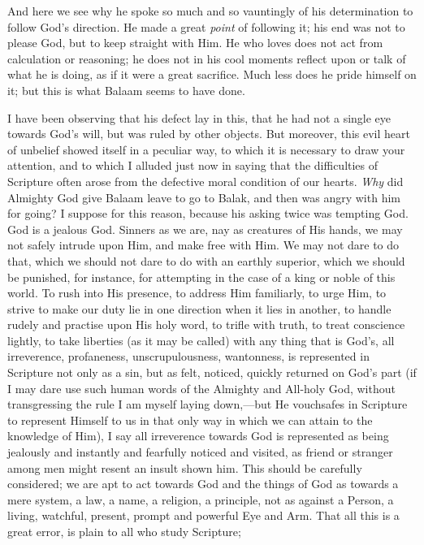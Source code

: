 And here we see why he spoke so much and so vauntingly of his
determination to follow God's direction. He made a great \emph{point}
of following it; his end was not to please God, but to keep straight
with Him. He who loves does not act from calculation or reasoning; he
does not in his cool moments reflect upon or talk of what he is doing,
as if it were a great sacrifice. Much less does he pride himself on
it; but this is what Balaam seems to have done.

I have been observing that his defect lay in this, that he had not
a single eye towards God's will, but was ruled by other objects. But
moreover, this evil heart of unbelief showed itself in a peculiar way,
to which it is necessary to draw your attention, and to which I
alluded just now in saying that the difficulties of Scripture often
arose from the defective moral condition of our hearts. \emph{Why} did Almighty God give Balaam leave to go to Balak, and then
was angry with him for going? I suppose for this reason, because his
asking twice was tempting God. God is a jealous God. Sinners as we
are, nay as creatures of His hands, we may not safely intrude upon
Him, and make free with Him. We may not dare to do that, which we
should not dare to do with an earthly superior, which we should be
punished, for instance, for attempting in the case of a king or noble
of this world. To rush into His presence, to address Him familiarly,
to urge Him, to strive to make our duty lie in one direction when it
lies in another, to handle rudely and practise upon His holy word, to
trifle with truth, to treat conscience lightly, to take liberties (as
it may be called) with any thing that is God's, all irreverence,
profaneness, unscrupulousness, wantonness, is represented in Scripture
not only as a sin, but as felt, noticed, quickly returned on God's
part (if I may dare use such human words of the Almighty and All-holy
God, without transgressing the rule I am myself laying down,—but He
vouchsafes in Scripture to represent Himself to us in that only way in
which we can attain to the knowledge of Him), I say all irreverence
towards God is represented as being jealously and instantly and
fearfully noticed and visited, as friend or stranger among men might
resent an insult shown him. This should be carefully considered; we
are apt to act towards God and the things of God as towards a mere
system, a law, a name, a religion, a principle, not as against a
Person, a living, watchful, present, prompt and powerful Eye and Arm.
That all this is a great error, is plain to all who study Scripture;
